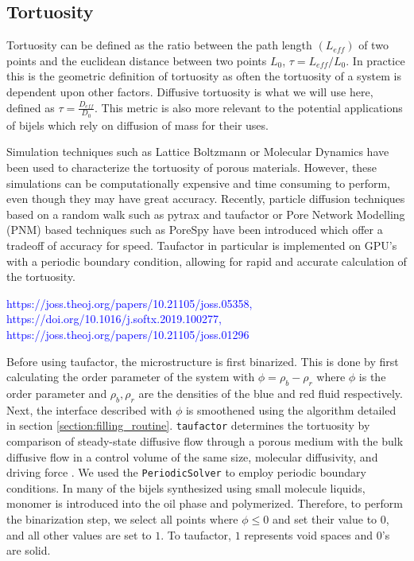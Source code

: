 \subsection{Tortuosity}
\label{section:tortuosity}

Tortuosity can be defined as the ratio between the path length $(L_{eff})$ of two points and the euclidean distance 
between two points $L_{0}$, $\tau = L_{eff}/L_{0}$. In practice this is the geometric definition of tortuosity as 
often the tortuosity of a system is dependent upon other factors. Diffusive tortuosity is what we will use here, 
defined as $\tau = \frac{D_{eff}}{D_0}$. This metric is also more relevant to the potential applications of bijels 
which rely on diffusion of mass for their uses.

Simulation techniques such as Lattice Boltzmann or Molecular Dynamics have been used to characterize the tortuosity of 
porous materials. However, these simulations can be computationally expensive and time consuming to perform, even though 
they may have great accuracy. Recently, particle diffusion techniques based on a random walk such as pytrax and taufactor 
or Pore Network Modelling (PNM) based techniques such as PoreSpy have been introduced which offer a tradeoff of accuracy 
for speed. Taufactor in particular is implemented on GPU's with a periodic boundary condition, allowing for rapid and 
accurate calculation of the tortuosity.

\textcolor{blue}{https://joss.theoj.org/papers/10.21105/joss.05358, https://doi.org/10.1016/j.softx.2019.100277, https://joss.theoj.org/papers/10.21105/joss.01296}

Before using taufactor, the microstructure is first binarized. This is done by first calculating the order parameter of 
the system with $\phi = \rho_b - \rho_r$ where $\phi$ is the order parameter and $\rho_b, \rho_r$ are the densities of 
the blue and red fluid respectively. Next, the interface described with $\phi$ is smoothened using the algorithm detailed 
in section \ref{section:filling_routine}. \texttt{taufactor} determines the tortuosity by comparison
of steady-state diffusive flow through a porous medium with the bulk
diffusive flow in a control volume of the same size, molecular
diffusivity, and driving force \cite{cooper_taufactor_2016}. We used
the \texttt{PeriodicSolver} to employ periodic boundary conditions. In many of the bijels synthesized using small molecule liquids, monomer is 
introduced into the oil phase and polymerized. Therefore, to perform the binarization step, we select all points where 
$\phi \leq 0$ and set their value to $0$, and all other values are set to $1$. To taufactor, $1$ represents void spaces 
and 0's are solid. \cite{cooper_taufactor_2016}

